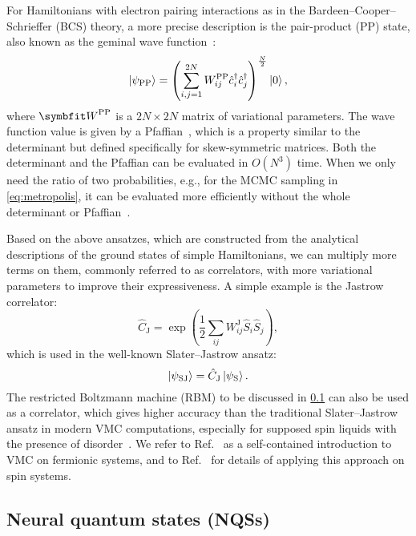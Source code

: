 For Hamiltonians with electron pairing interactions as in the Bardeen--Cooper--Schrieffer (BCS) theory, a more precise description is the pair-product (PP) state, also known as the geminal wave function~\cite{bouchaud1988pair, gros1988superconductivity, tahara2008variational, astrakhantsev2021broken}:
\begin{equation}
\ket{\psi_\text{PP}} = \left( \sum_{i, j = 1}^{2 N} W^\text{PP}_{i j} \hat{c}^\dagger_i \hat{c}^\dagger_j \right)^{\frac{N}{2}} \ket{0},
\end{equation}
where $\mW^\text{PP}$ is a $2 N \times 2 N$ matrix of variational parameters. The wave function value is given by a Pfaffian~\cite{cayley1849determinants}, which is a property similar to the determinant but defined specifically for skew-symmetric matrices. Both the determinant and the Pfaffian can be evaluated in $O(N^3)$ time. When we only need the ratio of two probabilities, e.g., for the MCMC sampling in \cref{eq:metropolis}, it can be evaluated more efficiently without the whole determinant or Pfaffian~\cite{becca2017quantum5}.

Based on the above ansatzes, which are constructed from the analytical descriptions of the ground states of simple Hamiltonians, we can multiply more terms on them, commonly referred to as correlators, with more variational parameters to improve their expressiveness. A simple example is the Jastrow correlator:
\begin{equation}
\hat{C}_\text{J} = \exp\left( {\frac{1}{2} \sum_{i j} W^\text{J}_{i j} \hat{S}_i \hat{S}_j} \right),
\end{equation}
which is used in the well-known Slater--Jastrow ansatz:
\begin{equation}
\ket{\psi_\text{SJ}} = \hat{C}_\text{J} \ket{\psi_\text{S}}.
\end{equation}
The restricted Boltzmann machine (RBM) to be discussed in \cref{sec:nqs} can also be used as a correlator, which gives higher accuracy than the traditional Slater--Jastrow ansatz in modern VMC computations, especially for supposed spin liquids with the presence of disorder~\cite{nomura2017restricted, ferrari2019neural, nomura2021dirac}. We refer to Ref.~\cite{becca2017quantum5} as a self-contained introduction to VMC on fermionic systems, and to Ref.~\cite{ferrari2019static} for details of applying this approach on spin systems.

\subsection{Neural quantum states (NQSs)}
\label{sec:nqs}


